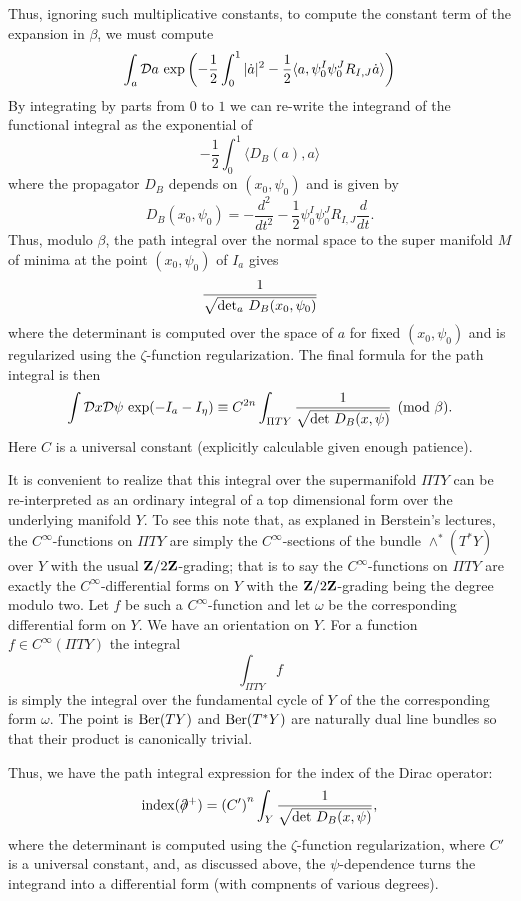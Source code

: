 Thus, ignoring such multiplicative constants, to compute the constant term
of the expansion in $\beta$, we must compute
$$\int_a{\cal D}a\ {\exp}\left(-\frac{1}{2}\int_0^1|\dot
a|^2-\frac{1}{2}\langle a,\psi_0^I\psi_0^JR_{I,J}\dot a\rangle\right)$$
By integrating by parts from $0$ to $1$ we can re-write the integrand
of the functional integral as the exponential of
$$-\frac{1}{2}\int_0^1\langle D_B(a),a\rangle$$
where the propagator $D_B$ depends on $(x_0,\psi_0)$ and is given by
$$D_B(x_0,\psi_0)=-\frac{d^2}{dt^2}-\frac{1}{2}
\psi_0^I\psi_0^JR_{I,J}\frac{d}{dt}.$$ 
Thus, modulo $\beta$,  the path
integral over the normal  space to 
the super manifold $M$ of minima at the point $(x_0,\psi_0)$
of $I_a$ gives
$$\frac{1}{\sqrt{{\rm det}_a\ {D_B(x_0,\psi_0)}}}$$
where the determinant is computed over the space of $a$ for fixed
$(x_0,\psi_0)$ and is regularized using the $\zeta$-function
regularization. 
The final formula for the path integral is then
\begin{equation}\label{formula}
\int{\cal D}x{\cal D}\psi\ {\rm exp}(-I_a-I_\eta)\equiv
C^{2n}\int_{\Pi TY}
\frac{1}{\sqrt{{\rm det}\ D_B(x,\psi)}} \pmod\beta.
\end{equation}
Here $C$ is a universal constant (explicitly calculable given enough
patience). 

It is convenient to realize that this integral over the  supermanifold
$\Pi TY$ can be re-interpreted 
as an ordinary integral of a top dimensional form
over the underlying manifold $Y$.
To see this note  that, as explaned in Berstein's lectures,  the
$C^\infty$-functions on $\Pi TY$ are simply the 
$C^\infty$-sections of the bundle $\wedge^*(T^*Y)$ over $Y$ with the
usual ${\bf Z}/2{\bf Z}$-grading; that is to
say the $C^\infty$-functions on $\Pi TY$ are exactly the
$C^\infty$-differential forms on $Y$ with the ${\bf Z}/2{\bf
Z}$-grading being the degree modulo two.
Let $f$ be such a $C^\infty$-function and let $\omega$ be the
corresponding differential form on $Y$.
We have  an orientation on $Y$.
For a function $f\in C^\infty(\Pi TY)$ the integral
$$\int_{\Pi TY}f$$
is simply the integral over the fundamental cycle of $Y$ of the 
the corresponding form $\omega$.
The point is ${\rm Ber}(TY)$ and ${\rm Ber}(T^*Y)$ are naturally dual
line bundles so that their product is canonically trivial.



Thus, we have the path
integral expression for the index of the Dirac operator: 
$${\rm index}(\dirac^+)=\left(C'\right)^n\int_Y
\frac{1}{\sqrt{{\rm det}\ D_B(x,\psi)}},$$
where the determinant is computed using the $\zeta$-function
regularization, where $C'$ is a universal constant, and, as discussed
above, the $\psi$-dependence 
turns the integrand into a differential form (with compnents of
various degrees).  


